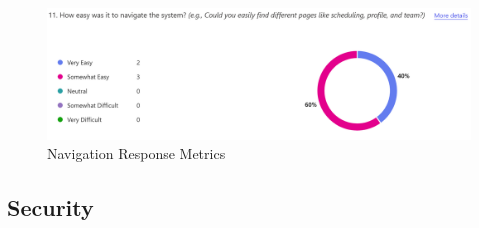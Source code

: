 \documentclass[12pt, titlepage]{article}
\begin{document}
\begin{figure}[H]
\centering
\includegraphics[scale=0.6]{survey_responses_navigation.png}
\caption{Navigation Response Metrics}
\label{nav}
\end{figure}
		
\subsection{Security}
\end{document}
